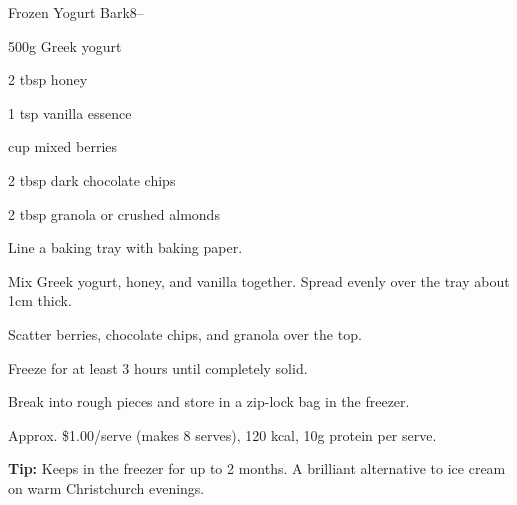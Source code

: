 \begin{recipebox}{Frozen Yogurt Bark}{8}{--}
\begin{ingredients}
  \item 500g Greek yogurt
  \item 2 tbsp honey
  \item 1 tsp vanilla essence
  \item \textonehalf{} cup mixed berries
  \item 2 tbsp dark chocolate chips
  \item 2 tbsp granola or crushed almonds
\end{ingredients}

\begin{method}
  \item Line a baking tray with baking paper.
  \item Mix Greek yogurt, honey, and vanilla together. Spread evenly over the tray about 1cm thick.
  \item Scatter berries, chocolate chips, and granola over the top.
  \item Freeze for at least 3 hours until completely solid.
  \item Break into rough pieces and store in a zip-lock bag in the freezer.
\end{method}

\begin{notelist}
  \item Approx. \$1.00/serve (makes 8 serves), 120 kcal, 10g protein per serve.
  \item \textbf{Tip:} Keeps in the freezer for up to 2 months. A brilliant alternative to ice cream on warm Christchurch evenings.
\end{notelist}
\end{recipebox}
